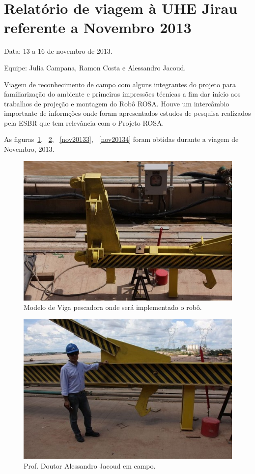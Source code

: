 \section{Relatório de viagem à UHE Jirau
referente a Novembro 2013}\label{sec::nov2013}
Data: 13 a 16 de novembro de 2013.

Equipe: Julia Campana, Ramon Costa e Alessandro Jacoud.


Viagem de reconhecimento de campo com alguns integrantes do projeto para
familiarização do ambiente e primeiras impressões técnicas a fim dar início aos
trabalhos de projeção e montagem do Robô ROSA. Houve um intercâmbio importante
de informções onde foram apresentados estudos de pesquisa realizados pela ESBR
que tem relevância com o Projeto ROSA.

As figuras~\ref{nov20131}, ~\ref{nov20132}, ~\ref{nov20133}, ~\ref{nov20134}
foram obtidas durante a viagem de Novembro, 2013.



\begin{figure}[h!]
\centering
  \includegraphics[width=1\linewidth]{Fotos/Novembro2013/1.jpg}
  \caption{Modelo de Viga pescadora onde será implementado o robô.}
  \label{nov20131}
\end{figure}

\begin{figure}[h!]
  \centering
  \includegraphics[width=1\linewidth]{Fotos/Novembro2013/2.jpg}
  \caption{Prof. Doutor Alessandro Jacoud em campo.}
  \label{nov20132}
\end{figure}

